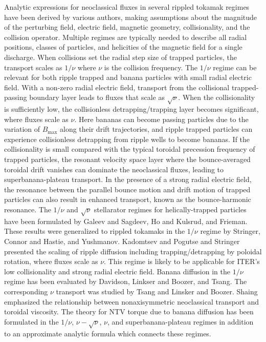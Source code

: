 \documentclass[aip, pop, preprint]{revtex4-1}
\begin{document}
Analytic expressions for neoclassical fluxes in several rippled tokamak regimes have been derived by various authors, making assumptions about the magnitude of the perturbing field, electric field, magnetic geometry, collisionality, and the collision operator. Multiple regimes are typically needed to describe all radial positions, classes of particles, and helicities of the magnetic field for a single discharge. When collisions set the radial step size of trapped particles, the transport scales as $1/\nu$ where $\nu$ is the collision frequency. The $1/\nu$ regime can be relevant for both ripple trapped and banana particles with small radial electric field. With a non-zero radial electric field, transport from the collisional trapped-passing boundary layer leads to fluxes that scale as $\sqrt{\nu}$. When the collisionality is sufficiently low, the collisionless detrapping/trapping layer becomes significant, where fluxes scale as $\nu$. Here bananas can become passing particles due to the variation of $B_{\max}$ along their drift trajectories,\cite{Shaing2009} and ripple trapped particles can experience collisionless detrapping from ripple wells to become bananas.\cite{Shaing1982a, Shaing1982b} If the collisionality is small compared with the typical toroidal precession frequency of trapped particles, the resonant velocity space layer where the bounce-averaged toroidal drift vanishes can dominate the neoclassical fluxes, leading to superbanana-plateau transport.\cite{Shaing2009_sbp} In the presence of a strong radial electric field, the resonance between the parallel bounce motion and drift motion of trapped particles can also result in enhanced transport, known as the bounce-harmonic resonance.\cite{Linsker1982,Park2009} The $1/\nu$ and $\sqrt{\nu}$ stellarator regimes for helically-trapped particles have been formulated by Galeev and Sagdeev,\cite{Galeev1969} Ho and Kulsrud,\cite{Ho1987} and Frieman.\cite{Frieman1970} These results were generalized to rippled tokamaks in the $1/\nu$ regime by Stringer,\cite{Stringer1972} Connor and Hastie,\cite{Connor1973} and Yushmanov.\cite{Yushmanov1982} Kadomtsev and Pogutse\cite{Kadomtsev1971} and Stringer \cite{Stringer1972} presented the scaling of ripple diffusion including trapping/detrapping by poloidal rotation, where fluxes scale as $\nu$. This regime is likely to be applicable for ITER's low collisionality and strong radial electric field. Banana diffusion in the $1/\nu$ regime has been evaluated by Davidson,\cite{Davidson1976} Linkser and Boozer,\cite{Linsker1982} and Tsang.\cite{Tsang1977} The corresponding $\nu$ transport was studied by Tsang \cite{Tsang1977} and Linsker and Boozer.\cite{Linsker1982} Shaing emphasized the relationship between nonaxisymmetric neoclassical transport and toroidal viscosity.\cite{Shaing1983} The theory for NTV torque due to banana diffusion has been formulated in the $1/\nu$,\cite{Shaing2003} $\nu-\sqrt{\nu}$,\cite{Shaing2008} $\nu$,\cite{Shaing2009} and superbanana-plateau \cite{Shaing2009_sbp} regimes in addition to an approximate analytic formula which connects these regimes.\cite{Shaing2010}
\end{document}

